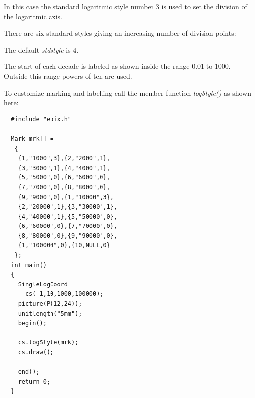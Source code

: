 \documentclass[12pt,a4paper]{article}
\begin{document}
  In this case the standard logaritmic style number 3 is used to set
  the division of the logaritmic axis.

  There are six standard styles giving an increasing number of
  division points:

  \begin{center}
    
  \end{center}
  \begin{center}
    
  \end{center}
  \begin{center}
    
  \end{center}
  \begin{center}
    
  \end{center}
  \begin{center}
    
  \end{center}
  \begin{center}
    
  \end{center}

  The default \textit{stdstyle} is 4.

  The start of each decade is labeled as shown inside the range 0.01
  to 1000.  Outside this range powers of ten are used.

  To customize marking and labelling call the member function
  \textit{logStyle()} as shown here:

  \begin{minipage}{8.0cm}
    \begin{lstlisting}
  #include "epix.h"

  Mark mrk[] =
   {
    {1,"1000",3},{2,"2000",1},
    {3,"3000",1},{4,"4000",1},
    {5,"5000",0},{6,"6000",0},
    {7,"7000",0},{8,"8000",0},
    {9,"9000",0},{1,"10000",3},
    {2,"20000",1},{3,"30000",1},
    {4,"40000",1},{5,"50000",0},
    {6,"60000",0},{7,"70000",0},
    {8,"80000",0},{9,"90000",0},
    {1,"100000",0},{10,NULL,0}
   };
  int main()
  {
    SingleLogCoord
      cs(-1,10,1000,100000);
    picture(P(12,24));
    unitlength("5mm");
    begin();

    cs.logStyle(mrk);
    cs.draw();

    end();
    return 0;
  }
    \end{lstlisting}
  \end{minipage}
  \begin{minipage}{5.5cm}
    
  \end{minipage}
\end{document}
